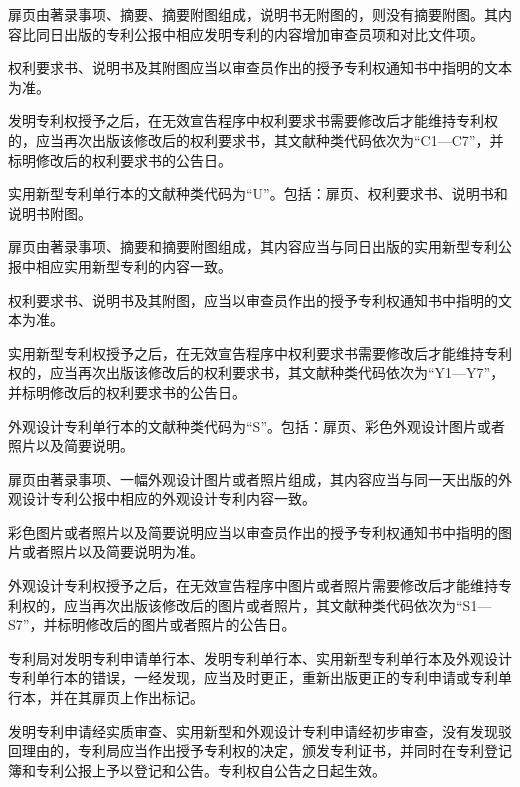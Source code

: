 扉页由著录事项、摘要、摘要附图组成，说明书无附图的，则没有摘要附图。其内容比同日出版的专利公报中相应发明专利的内容增加审查员项和对比文件项。

权利要求书、说明书及其附图应当以审查员作出的授予专利权通知书中指明的文本为准。

发明专利权授予之后，在无效宣告程序中权利要求书需要修改后才能维持专利权的，应当再次出版该修改后的权利要求书，其文献种类代码依次为“C1—C7”，并标明修改后的权利要求书的公告日。

实用新型专利单行本的文献种类代码为“U”。包括：扉页、权利要求书、说明书和说明书附图。

扉页由著录事项、摘要和摘要附图组成，其内容应当与同日出版的实用新型专利公报中相应实用新型专利的内容一致。

权利要求书、说明书及其附图，应当以审查员作出的授予专利权通知书中指明的文本为准。

实用新型专利权授予之后，在无效宣告程序中权利要求书需要修改后才能维持专利权的，应当再次出版该修改后的权利要求书，其文献种类代码依次为“Y1—Y7”，并标明修改后的权利要求书的公告日。

外观设计专利单行本的文献种类代码为“S”。包括：扉页、彩色外观设计图片或者照片以及简要说明。

扉页由著录事项、一幅外观设计图片或者照片组成，其内容应当与同一天出版的外观设计专利公报中相应的外观设计专利内容一致。

彩色图片或者照片以及简要说明应当以审查员作出的授予专利权通知书中指明的图片或者照片以及简要说明为准。

外观设计专利权授予之后，在无效宣告程序中图片或者照片需要修改后才能维持专利权的，应当再次出版该修改后的图片或者照片，其文献种类代码依次为“S1—S7”，并标明修改后的图片或者照片的公告日。

专利局对发明专利申请单行本、发明专利单行本、实用新型专利单行本及外观设计专利单行本的错误，一经发现，应当及时更正，重新出版更正的专利申请或专利单行本，并在其扉页上作出标记。

发明专利申请经实质审查、实用新型和外观设计专利申请经初步审查，没有发现驳回理由的，专利局应当作出授予专利权的决定，颁发专利证书，并同时在专利登记簿和专利公报上予以登记和公告。专利权自公告之日起生效。

